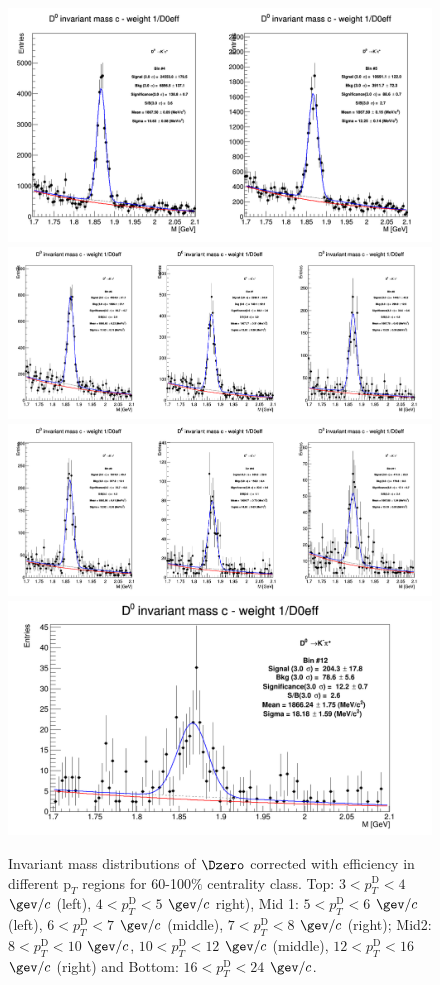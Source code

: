 \begin{figure}[!htp]
\centering
{\includegraphics[width=0.7\linewidth]{figuresVsCent/Dzero/MassPlots/60100/InvMassDistributions_Dzero_Bins4to5.png}}
{\includegraphics[width=0.9\linewidth]{figuresVsCent/Dzero/MassPlots/60100/InvMassDistributions_Dzero_Bins6to8.png}}
{\includegraphics[width=0.9\linewidth]{figuresVsCent/Dzero/MassPlots/60100/InvMassDistributions_Dzero_Bins9to11.png}}
{\includegraphics[width=0.6\linewidth]{figuresVsCent/Dzero/MassPlots/60100/InvMassDistributions_Dzero_Bins12to12.png}}

\caption{Invariant mass distributions of $\Dzero$ corrected with efficiency in different $\text{p}_T$ regions for 60-100$\%$ centrality class. Top: $3< p_{T}^{\text{D}}< 4$ $\gev/c$ (left), $4< p_{T}^{\text{D}}< 5$ $\gev/c$ right), Mid 1: $5< p_{T}^{\text{D}}< 6$ $\gev/c$ (left), $6 < p_{T}^{\text{D}} < 7$ $\gev/c$ (middle), $7< p_{T}^{\text{D}}< 8$ $\gev/c$ (right); Mid2: $8< p_{T}^{\text{D}}< 10$ $\gev/c$, $10< p_{T}^{\text{D}}< 12$ $\gev/c$  (middle), $12 < p_{T}^{\text{D}}< 16$ $\gev/c$  (right) and Bottom: $16<p_{T}^{\text{D}}< 24$ $\gev/c$.}
\label{fig:InvMassD060100}
\end{figure}

